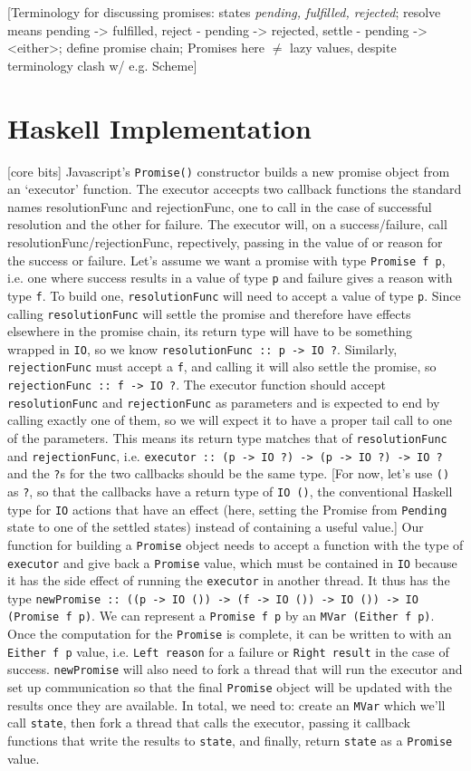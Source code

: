 \documentclass[sigplan,screen]{acmart}
\newcommand{\lit}[1]{\lstinline{#1}}
\begin{document}
[Terminology for discussing promises: states \emph{pending, fulfilled, rejected}; resolve means pending -> fulfilled, reject - pending -> rejected, settle - pending -> <either>; define promise chain; Promises here $\neq$ lazy values, despite terminology clash w/ e.g. Scheme]

\section{Haskell Implementation}

[core bits]
Javascript's \lit{Promise()} constructor builds a new promise object from an `executor' function.  The executor accecpts two callback functions the standard names resolutionFunc and rejectionFunc, one to call in the case of successful resolution and the other for failure.  The executor will, on a success/failure, call resolutionFunc/rejectionFunc, repectively, passing in the value of or reason for the success or failure.  Let's assume we want a promise with type \lit{Promise f p}, i.e. one where success results in a value of type \lit p and failure gives a reason with type \lit f.  To build one, \lit{resolutionFunc} will need to accept a value of type \lit p.  Since calling \lit{resolutionFunc} will settle the promise and therefore have effects elsewhere in the promise chain, its return type will have to be something wrapped in \lit{IO}, so we know \lit{resolutionFunc :: p -> IO ?}.  Similarly, \lit{rejectionFunc} must accept a \lit f, and calling it will also settle the promise, so \lit{rejectionFunc :: f -> IO ?}.  The executor function should accept \lit{resolutionFunc} and \lit{rejectionFunc} as parameters and is expected to end by calling exactly one of them, so we will expect it to have a proper tail call to one of the parameters.  This means its return type matches that of \lit{resolutionFunc} and \lit{rejectionFunc}, i.e. \lit{executor :: (p -> IO ?) -> (p -> IO ?) -> IO ?} and the \lit ?s for the two callbacks should be the same type.  [For now, let's use \lit{()} as \lit ?, so that the callbacks have a return type of \lit{IO ()}, the conventional Haskell type for \lit{IO} actions that have an effect (here, setting the Promise from \lit{Pending} state to one of the settled states) instead of containing a useful value.]  Our function for building a \lit{Promise} object needs to accept a function with the type of \lit{executor} and give back a \lit{Promise} value, which must be contained in \lit{IO} because it has the side effect of running the \lit{executor} in another thread.  It thus has the type \lit{newPromise :: ((p -> IO ()) -> (f -> IO ()) -> IO ()) -> IO (Promise f p)}.  We can represent a \lit{Promise f p} by an \lit{MVar (Either f p)}.  Once the computation for the \lit{Promise} is complete, it can be written to with an \lit{Either f p} value, i.e. \lit{Left reason} for a failure or \lit{Right result} in the case of success.  \lit{newPromise} will also need to fork a thread that will run the executor and set up communication so that the final \lit{Promise} object will be updated with the results once they are available.  In total, we need to: create an \lit{MVar} which we'll call \lit{state}, then fork a thread that calls the executor, passing it callback functions that write the results to \lit{state}, and finally, return \lit{state} as a \lit{Promise} value.
\end{document}
